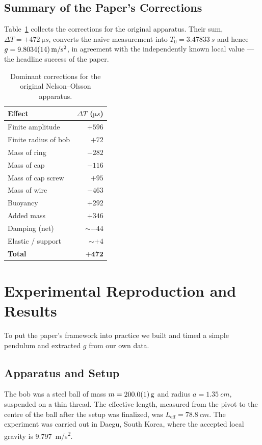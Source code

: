 \documentclass[11pt]{article}
\begin{document}
\subsection{Summary of the Paper's Corrections}
Table~\ref{tab:corrections} collects the corrections for the original apparatus. Their
sum, $\Delta T = +\SI{472}{\micro s}$, converts the naive measurement into
$T_0 = \SI{3.47833}{s}$ and hence $g = \SI{9.8034 \pm 0.0014}{m/s^2}$, in agreement with
the independently known local value --- the headline success of the paper.

\begin{table}[h]
\centering
\caption{Dominant corrections for the original Nelson--Olsson apparatus.}
\label{tab:corrections}
\begin{tabular}{lr}
\toprule
Effect & $\Delta T$ ($\si{\micro s}$)\\
\midrule
Finite amplitude        & $+596$\\
Finite radius of bob    & $+72$\\
Mass of ring            & $-282$\\
Mass of cap             & $-116$\\
Mass of cap screw       & $+95$\\
Mass of wire            & $-463$\\
Buoyancy                & $+292$\\
Added mass              & $+346$\\
Damping (net)           & $\sim -44$\\
Elastic / support       & $\sim +4$\\
\midrule
\textbf{Total}          & $\mathbf{+472}$\\
\bottomrule
\end{tabular}
\end{table}

\section{Experimental Reproduction and Results}
\label{sec:experiment}

To put the paper's framework into practice we built and timed a simple pendulum and
extracted $g$ from our own data.

\subsection{Apparatus and Setup}
The bob was a steel ball of mass $m = \SI{200.0 \pm 0.1}{g}$ and radius
$a = \SI{1.35}{cm}$, suspended on a thin thread. The effective length, measured from the
pivot to the centre of the ball after the setup was finalized, was
$L_{\mathrm{eff}} = \SI{78.8}{cm}$. The experiment was carried out in Daegu, South Korea,
where the accepted local gravity is \SI{9.797}{m/s^2}.
\end{document}

